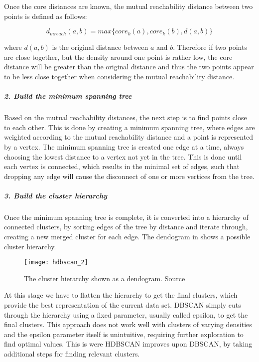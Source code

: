Once the core distances are known, the mutual reachability distance between two points is defined as follows:

\begin{equation*}
    d_{mreach}(a, b) = max\{core_k(a), core_k(b), d(a, b)\}
\end{equation*}

where $d(a, b)$ is the original distance between $a$ and $b$.
Therefore if two points are close together, but the density around one point is rather low,
the core distance will be greater than the original distance and thus the two points appear to be less close together
when considering the mutual reachability distance.

\subparagraph{2. Build the minimum spanning tree}
Based on the mutual reachability distances, the next step is to find points close to each other.
This is done by creating a minimum spanning tree,
where edges are weighted according to the mutual reachability distance and a point is represented by a vertex.
The minimum spanning tree is created one edge at a time,
always choosing the lowest distance to a vertex not yet in the tree.
This is done until each vertex is connected, which results in the minimal set of edges,
such that dropping any edge will cause the disconnect of one or more vertices from the tree.

\subparagraph{3. Build the cluster hierarchy}
Once the minimum spanning tree is complete, it is converted into a hierarchy of connected clusters,
by sorting edges of the tree by distance and iterate through, creating a new merged cluster for each edge.
The dendogram in  shows a possible cluster hierarchy. %

\begin{figure}[h]
    \centering
    \texttt{[image: hdbscan\_2]}
    \caption{The cluster hierarchy shown as a dendogram. Source\cite{how_hdbscan_works}}
    \label{fig:hdbscan_2}
\end{figure}

At this stage we have to flatten the hierarchy to get the final clusters,
which provide the best representation of the current data set.
DBSCAN simply cuts through the hierarchy using a fixed parameter, usually called epsilon, to get the final clusters.
This approach does not work well with clusters of varying densities and the epsilon parameter itself is unintuitive,
requiring further exploration to find optimal values.
This is were HDBSCAN improves upon DBSCAN, by taking additional steps for finding relevant clusters.

